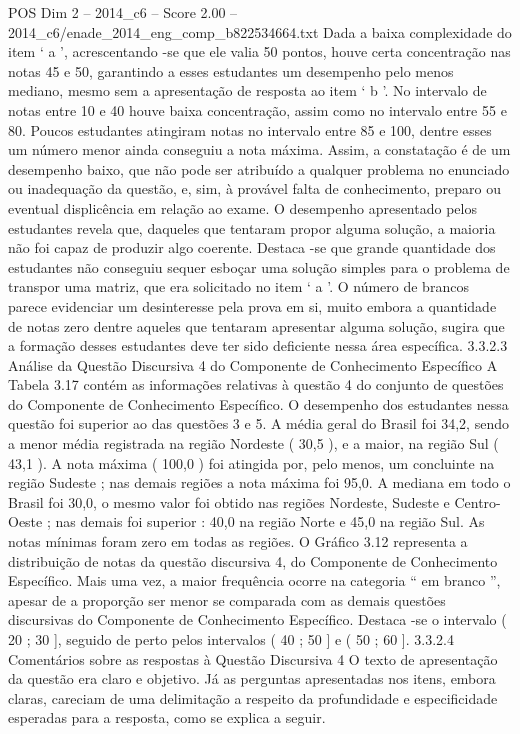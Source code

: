 \begin{textsample}{POS Dim 2 – 2014\_c6 – Score 2.00 – 2014\_c6/enade\_2014\_eng\_comp\_b822534664.txt}
Dada a baixa complexidade do item ‘ a ’, acrescentando -se que ele valia 50 pontos, houve certa concentração nas notas 45 e 50, garantindo a esses estudantes um desempenho pelo menos mediano, mesmo sem a apresentação de resposta ao item ‘ b ’.
No intervalo de notas entre 10 e 40 houve baixa concentração, assim como no intervalo entre 55 e 80.
Poucos estudantes atingiram notas no intervalo entre 85 e 100, dentre esses um número menor ainda conseguiu a nota máxima.
Assim, a constatação é de um desempenho baixo, que não pode ser atribuído a qualquer problema no enunciado ou inadequação da questão, e, sim, à provável falta de conhecimento, preparo ou eventual displicência em relação ao exame.
O desempenho apresentado pelos estudantes revela que, daqueles que tentaram propor alguma solução, a maioria não foi capaz de produzir algo coerente.
Destaca -se que grande quantidade dos estudantes não conseguiu sequer esboçar uma solução simples para o problema de transpor uma matriz, que era solicitado no item ‘ a ’.
O número de brancos parece evidenciar um desinteresse pela prova em si, muito embora a quantidade de notas zero dentre aqueles que tentaram apresentar alguma solução, sugira que a formação desses estudantes deve ter sido deficiente nessa área específica. 3.3.2.3 Análise da Questão Discursiva 4 do Componente de Conhecimento Específico A Tabela 3.17 contém as informações relativas à questão 4 do conjunto de questões do Componente de Conhecimento Específico.
O desempenho dos estudantes nessa questão foi superior ao das questões 3 e 5.
A média geral do Brasil foi 34,2, sendo a menor média registrada na região Nordeste ( 30,5 ), e a maior, na região Sul ( 43,1 ).
A nota máxima ( 100,0 ) foi atingida por, pelo menos, um concluinte na região Sudeste ; nas demais regiões a nota máxima foi 95,0.
A mediana em todo o Brasil foi 30,0, o mesmo valor foi obtido nas regiões Nordeste, Sudeste e Centro-Oeste ; nas demais foi superior : 40,0 na região Norte e 45,0 na região Sul.
As notas mínimas foram zero em todas as regiões.
O Gráfico 3.12 representa a distribuição de notas da questão discursiva 4, do Componente de Conhecimento Específico.
Mais uma vez, a maior frequência ocorre na categoria “ em branco ”, apesar de a proporção ser menor se comparada com as demais questões discursivas do Componente de Conhecimento Específico.
Destaca -se o intervalo ( 20 ; 30 ], seguido de perto pelos intervalos ( 40 ; 50 ] e ( 50 ; 60 ]. 3.3.2.4 Comentários sobre as respostas à Questão Discursiva 4 O texto de apresentação da questão era claro e objetivo.
Já as perguntas apresentadas nos itens, embora claras, careciam de uma delimitação a respeito da profundidade e especificidade esperadas para a resposta, como se explica a seguir.

\end{textsample}
